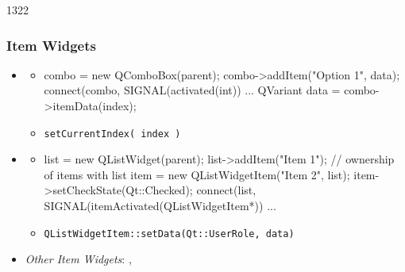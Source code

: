 \begin{slide}[fragile]{1322}
  \frametitle{Item Widgets}
  \begin{itemize}
  \item \textbf{}
    \begin{itemize}
    \item[]
      \begin{cpp}
combo = new QComboBox(parent);        
combo->addItem("Option 1", data);
connect(combo, SIGNAL(activated(int)) ...
QVariant data = combo->itemData(index);
     \end{cpp}
   \item \texttt{setCurrentIndex( index )}
   \end{itemize}

  \item \textbf{}
    \begin{itemize}
    \item[]
      \begin{cpp}
list = new QListWidget(parent);
list->addItem("Item 1");
// ownership of items with list
item = new QListWidgetItem("Item 2", list);
item->setCheckState(Qt::Checked);        
connect(list, SIGNAL(itemActivated(QListWidgetItem*)) ...
      \end{cpp}
    \item \texttt{QListWidgetItem::setData(Qt::UserRole, data)}

   \end{itemize}
   \smallskip
 \item \textit{Other Item Widgets}: , 
 \end{itemize}

\end{slide}

